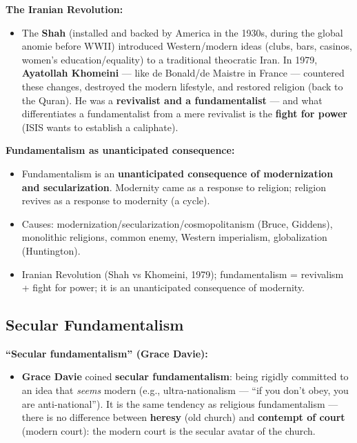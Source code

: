 \begin{ExampleBox}
\textbf{The Iranian Revolution:}
\begin{itemize}
\item The \textbf{Shah} (installed and backed by America in the 1930s, during the global anomie before WWII) introduced Western/modern ideas (clubs, bars, casinos, women's education/equality) to a traditional theocratic Iran. In 1979, \textbf{Ayatollah Khomeini} --- like de Bonald/de Maistre in France --- countered these changes, destroyed the modern lifestyle, and restored religion (back to the Quran). He was a \textbf{revivalist and a fundamentalist} --- and what differentiates a fundamentalist from a mere revivalist is the \textbf{fight for power} (ISIS wants to establish a caliphate).
\end{itemize}
\end{ExampleBox}

\begin{CriticalPoint}
\textbf{Fundamentalism as unanticipated consequence:}
\begin{itemize}
\item Fundamentalism is an \textbf{unanticipated consequence of modernization and secularization}. Modernity came as a response to religion; religion revives as a response to modernity (a cycle).
\end{itemize}
\end{CriticalPoint}

\begin{QuickRevision}
\begin{itemize}
\item Causes: modernization/secularization/cosmopolitanism (Bruce, Giddens), monolithic religions, common enemy, Western imperialism, globalization (Huntington).
\item Iranian Revolution (Shah vs Khomeini, 1979); fundamentalism = revivalism + fight for power; it is an unanticipated consequence of modernity.
\end{itemize}
\end{QuickRevision}

\sectiondivider

\subsection{Secular Fundamentalism}

\begin{CriticalPoint}
\textbf{``Secular fundamentalism'' (Grace Davie):}
\begin{itemize}
\item \textbf{Grace Davie} coined \textbf{secular fundamentalism}: being rigidly committed to an idea that \textit{seems} modern (e.g., ultra-nationalism --- ``if you don't obey, you are anti-national''). It is the same tendency as religious fundamentalism --- there is no difference between \textbf{heresy} (old church) and \textbf{contempt of court} (modern court): the modern court is the secular avatar of the church.
\end{itemize}
\end{CriticalPoint}

